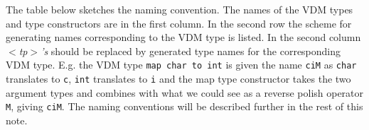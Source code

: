 \documentclass[\pformat,12pt]{article}
\begin{document}
%
%
%
%
%

The table below sketches the naming convention. 
The names of the VDM types and type constructors are in the first
column. In the second row the scheme for generating names
corresponding to the VDM type is listed. In the
second column {\em $<$tp$>$'s} should be replaced by generated type names for
the corresponding VDM type. E.g. the VDM type \verb+map char to int+
is given the name \verb+ciM+ as \verb+char+ translates to \verb+c+,
\verb+int+ translates to \verb+i+ and the map type constructor takes
the two argument types and combines with what we could see as a
reverse polish operator \verb+M+, giving \verb+ciM+. The naming
conventions will be described further in the rest of this note.
\end{document}
